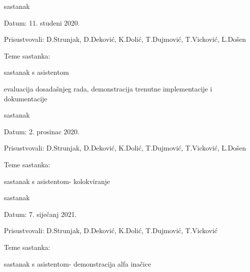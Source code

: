 \begin{packed_enum}
			\item  sastanak
			\item[] \begin{packed_item}
				\item Datum: 11. studeni 2020. 
				\item Prisustvovali: D.Strunjak, D.Deković, K.Dolić, T.Dujmović, T.Vicković, L.Došen
				\item Teme sastanka:
				\begin{packed_item}
					\item sastanak s asistentom
					\item evaluacija dosadašnjeg rada, demonstracija trenutne implementacije i dokumentacije
				\end{packed_item}
			\end{packed_item}
		
			\item  sastanak
			\item[] \begin{packed_item}
				\item Datum: 2. prosinac 2020. 
				\item Prisustvovali: D.Strunjak, D.Deković, K.Dolić, T.Dujmović, T.Vicković, L.Došen
				\item Teme sastanka:
				\begin{packed_item}
					\item sastanak s asistentom- kolokviranje
				\end{packed_item}
			\end{packed_item}
		
			\item  sastanak
			\item[] \begin{packed_item}
				\item Datum: 7. siječanj 2021. 
				\item Prisustvovali: D.Strunjak, D.Deković, K.Dolić, T.Dujmović, T.Vicković
				\item Teme sastanka:
				\begin{packed_item}
					\item sastanak s asistentom- demonstracija alfa inačice
				\end{packed_item}
			\end{packed_item}
			
			
			
			
		\end{packed_enum}
		
		\eject
